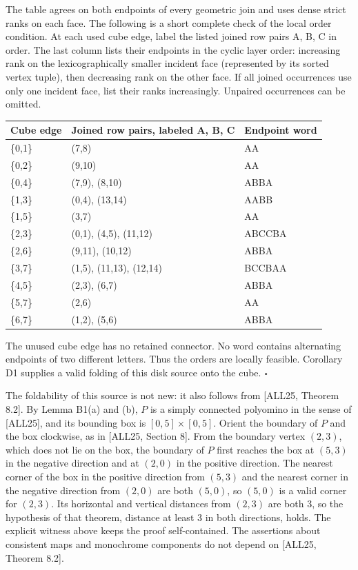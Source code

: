\documentclass[
  11pt,
]{article}
\newcounter{none} %
\begin{document}
The table agrees on both endpoints of every geometric join and uses
dense strict ranks on each face. The following is a short complete check
of the local order condition. At each used cube edge, label the listed
joined row pairs A, B, C in order. The last column lists their endpoints
in the cyclic layer order: increasing rank on the lexicographically
smaller incident face (represented by its sorted vertex tuple), then
decreasing rank on the other face. If all joined occurrences use only
one incident face, list their ranks increasingly. Unpaired occurrences
can be omitted.

{\def\LTcaptype{none} %
\begin{longtable}[]{@{}lll@{}}
\toprule\noalign{}
Cube edge & Joined row pairs, labeled A, B, C & Endpoint word \\
\midrule\noalign{}
\endhead
\bottomrule\noalign{}
\endlastfoot
\{0,1\} & (7,8) & AA \\
\{0,2\} & (9,10) & AA \\
\{0,4\} & (7,9), (8,10) & ABBA \\
\{1,3\} & (0,4), (13,14) & AABB \\
\{1,5\} & (3,7) & AA \\
\{2,3\} & (0,1), (4,5), (11,12) & ABCCBA \\
\{2,6\} & (9,11), (10,12) & ABBA \\
\{3,7\} & (1,5), (11,13), (12,14) & BCCBAA \\
\{4,5\} & (2,3), (6,7) & ABBA \\
\{5,7\} & (2,6) & AA \\
\{6,7\} & (1,2), (5,6) & ABBA \\
\end{longtable}
}

The unused cube edge has no retained connector. No word contains
alternating endpoints of two different letters. Thus the orders are
locally feasible. Corollary D1 supplies a valid folding of this disk
source onto the cube. \(\square\)

The foldability of this source is not new: it also follows from
{[}ALL25, Theorem 8.2{]}. By Lemma B1(a) and (b), \(P\) is a simply
connected polyomino in the sense of {[}ALL25{]}, and its bounding box is
\([0,5]\times[0,5]\). Orient the boundary of \(P\) and the box
clockwise, as in {[}ALL25, Section 8{]}. From the boundary vertex
\((2,3)\), which does not lie on the box, the boundary of \(P\) first
reaches the box at \((5,3)\) in the negative direction and at \((2,0)\)
in the positive direction. The nearest corner of the box in the positive
direction from \((5,3)\) and the nearest corner in the negative
direction from \((2,0)\) are both \((5,0)\), so \((5,0)\) is a valid
corner for \((2,3)\). Its horizontal and vertical distances from
\((2,3)\) are both \(3\), so the hypothesis of that theorem, distance at
least \(3\) in both directions, holds. The explicit witness above keeps
the proof self-contained. The assertions about consistent maps and
monochrome components do not depend on {[}ALL25, Theorem 8.2{]}.
\end{document}
